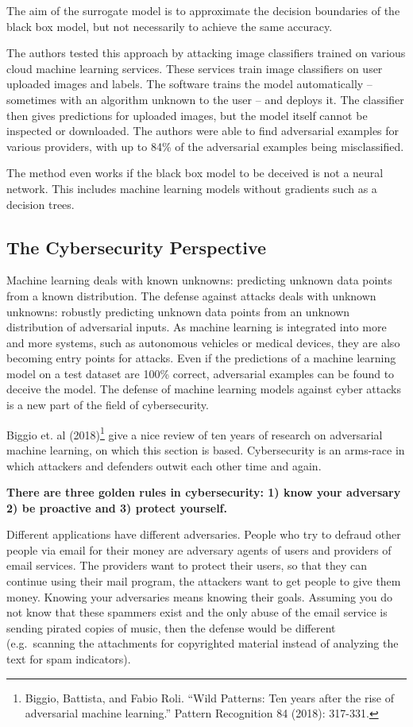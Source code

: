 \documentclass[12pt,]{krantz}
\begin{document}
The aim of the surrogate model is to approximate the decision boundaries
of the black box model, but not necessarily to achieve the same
accuracy.

The authors tested this approach by attacking image classifiers trained
on various cloud machine learning services. These services train image
classifiers on user uploaded images and labels. The software trains the
model automatically -- sometimes with an algorithm unknown to the user
-- and deploys it. The classifier then gives predictions for uploaded
images, but the model itself cannot be inspected or downloaded. The
authors were able to find adversarial examples for various providers,
with up to 84\% of the adversarial examples being misclassified.

The method even works if the black box model to be deceived is not a
neural network. This includes machine learning models without gradients
such as a decision trees.

\subsection{The Cybersecurity
Perspective}\label{the-cybersecurity-perspective}

Machine learning deals with known unknowns: predicting unknown data
points from a known distribution. The defense against attacks deals with
unknown unknowns: robustly predicting unknown data points from an
unknown distribution of adversarial inputs. As machine learning is
integrated into more and more systems, such as autonomous vehicles or
medical devices, they are also becoming entry points for attacks. Even
if the predictions of a machine learning model on a test dataset are
100\% correct, adversarial examples can be found to deceive the model.
The defense of machine learning models against cyber attacks is a new
part of the field of cybersecurity.

Biggio et. al (2018)\footnote{Biggio, Battista, and Fabio Roli. ``Wild
  Patterns: Ten years after the rise of adversarial machine learning.''
  Pattern Recognition 84 (2018): 317-331.} give a nice review of ten
years of research on adversarial machine learning, on which this section
is based. Cybersecurity is an arms-race in which attackers and defenders
outwit each other time and again.

\textbf{There are three golden rules in cybersecurity: 1) know your
adversary 2) be proactive and 3) protect yourself.}

Different applications have different adversaries. People who try to
defraud other people via email for their money are adversary agents of
users and providers of email services. The providers want to protect
their users, so that they can continue using their mail program, the
attackers want to get people to give them money. Knowing your
adversaries means knowing their goals. Assuming you do not know that
these spammers exist and the only abuse of the email service is sending
pirated copies of music, then the defense would be different
(e.g.~scanning the attachments for copyrighted material instead of
analyzing the text for spam indicators).
\end{document}
